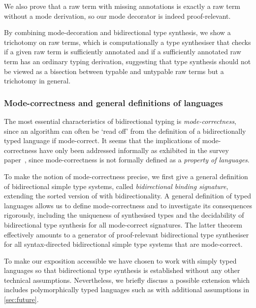 We also prove that a raw term with missing annotations is exactly a raw term without a mode derivation, so our mode decorator is indeed proof-relevant.

By combining mode-decoration and bidirectional type synthesis, we show a trichotomy on raw terms, which is computationally a type synthesiser that checks if a given raw term is sufficiently annotated and if a sufficiently annotated raw term has an ordinary typing derivation, suggesting that type synthesis should not be viewed as a bisection between typable and untypable raw terms but a trichotomy in general.

\subsubsection{Mode-correctness and general definitions of languages}
\label{sec:language-formalisation}
The most essential characteristics of bidirectional typing is \emph{mode-correctness}, since an algorithm can often be `read off' from the definition of a bidirectionally typed language if mode-correct.
It seems that the implications of mode-correctness have only been addressed informally as exhibited in the survey paper~\cite{Dunfield2021}, since mode-correctness is not formally defined as a \emph{property of languages}.

To make the notion of mode-correctness precise, we first give a general definition of bidirectional simple type systems, called \emph{bidirectional binding signature}, extending the sorted version of  with bidirectionality.
A general definition of typed languages allows us to define mode-correctness and to investigate its consequences rigorously, including the uniqueness of synthesised types and the decidability of bidirectional type synthesis for all mode-correct signatures.
The latter theorem effectively amounts to a generator of proof-relevant bidirectional type synthesiser for all syntax-directed bidirectional simple type systems that are mode-correct.


To make our exposition accessible we have chosen to work with simply typed languages so that bidirectional type synthesis is established without any other technical assumptions.
Nevertheless, we briefly discuss a possible extension which includes polymorphically typed languages such as \SystemF with additional assumptions in \cref{sec:future}.

